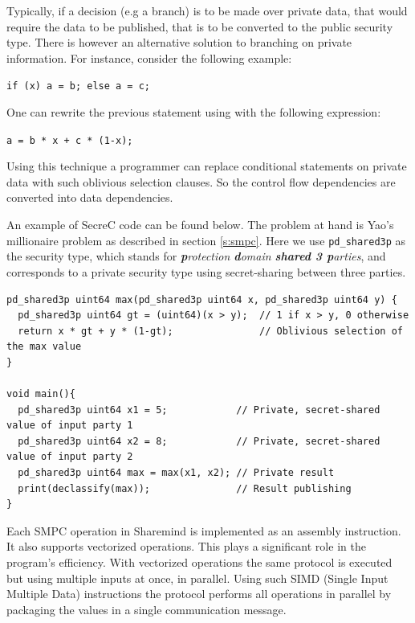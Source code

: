 Typically, if a decision (e.g a branch) is to be made over private data, that would require the data to be published, that is to be converted to the public security type.
There is however an alternative solution to branching on private information.
For instance, consider the following example:

\texttt{if (x) a = b; else a = c; }

One can rewrite the previous statement using with the following expression:

\texttt{a = b * x + c * (1-x); }

Using this technique a programmer can replace conditional statements on private data with such oblivious selection clauses.
So the control flow dependencies are converted into data dependencies.

An example of SecreC code can be found below.
The problem at hand is Yao's millionaire problem \cite{yao1982protocols} as described in section \ref{s:smpc}.
Here we use \texttt{pd\_shared3p} as the security type, which stands for \textit{\textbf{p}rotection \textbf{d}omain \textbf{shared 3 p}arties}, and corresponds to a private security type using secret\hyp sharing between three parties.

{
\begin{verbatim}
pd_shared3p uint64 max(pd_shared3p uint64 x, pd_shared3p uint64 y) {
  pd_shared3p uint64 gt = (uint64)(x > y);  // 1 if x > y, 0 otherwise
  return x * gt + y * (1-gt);               // Oblivious selection of the max value
}

void main(){
  pd_shared3p uint64 x1 = 5;            // Private, secret-shared value of input party 1
  pd_shared3p uint64 x2 = 8;            // Private, secret-shared value of input party 2
  pd_shared3p uint64 max = max(x1, x2); // Private result
  print(declassify(max));               // Result publishing
}
\end{verbatim}
\label{l:millionaires}
}

Each SMPC operation in Sharemind is implemented as an assembly instruction. It also supports vectorized operations. This plays a significant role in the program's efficiency.
With vectorized operations the same protocol is executed but using multiple inputs at once, in parallel.
Using such SIMD (Single Input Multiple Data) instructions the protocol performs all operations in parallel by packaging the values in a single communication message.

